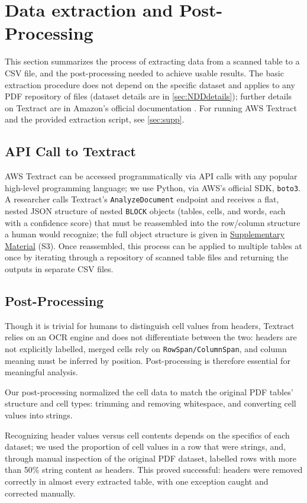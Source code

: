 \documentclass[12pt]{article}
\begin{document}
\section{Data extraction and Post-Processing} \label{sec:data-extraction}

This section summarizes the process of extracting data from a scanned table to a CSV file, and the post-processing needed to achieve usable results. The basic extraction procedure does not depend on the specific dataset and applies to any PDF repository of files (dataset details are in \cref{sec:NDDdetails}); further details on Textract are in Amazon's official documentation \cite{awsdocumentation}.
For running AWS Textract and the provided extraction script, see \cref{sec:supp}.

\subsection{API Call to Textract}
AWS Textract can be accessed programmatically via API calls with any popular high-level programming language; we use Python, via AWS's official SDK, \texttt{boto3}. A researcher calls Textract's \texttt{AnalyzeDocument} endpoint and receives a flat, nested JSON structure of nested \texttt{BLOCK} objects (tables, cells, and words, each with a confidence score) that must be reassembled into the row/column structure a human would recognize; the full object structure is given in \hyperref[sec:supp]{Supplementary Material} (S3). Once reassembled, this process can be applied to multiple tables at once by iterating through a repository of scanned table files and returning the outputs in separate CSV files.

\subsection{Post-Processing}\label{sec:postprocessing}
Though it is trivial for humans to distinguish cell values from headers, Textract relies on an OCR engine and does not differentiate between the two: headers are not explicitly labelled, merged cells rely on \texttt{RowSpan/ColumnSpan}, and column meaning must be inferred by position. Post-processing is therefore essential for meaningful analysis.

Our post-processing normalized the cell data to match the original PDF tables' structure and cell types: trimming and removing whitespace, and converting cell values into strings.

Recognizing header values versus cell contents depends on the specifics of each dataset; we used the proportion of cell values in a row that were strings, and, through manual inspection of the original PDF dataset, labelled rows with more than 50\% string content as headers. This proved successful: headers were removed correctly in almost every extracted table, with one exception caught and corrected manually.
\end{document}
